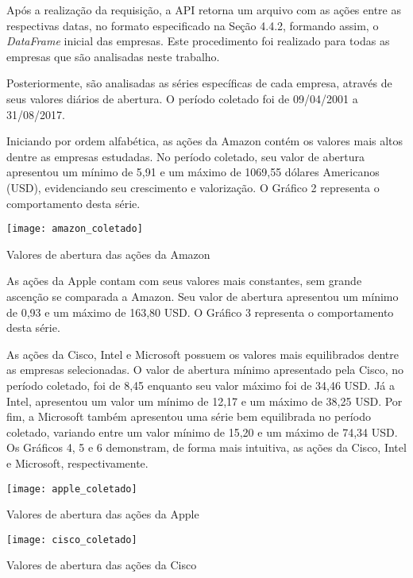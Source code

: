 Após a realização da requisição, a API retorna um arquivo com as ações entre as respectivas datas, no formato especificado na Seção 4.4.2, formando assim, o \textit{DataFrame} inicial das empresas. Este procedimento foi realizado para todas as empresas que são analisadas neste trabalho.

Posteriormente, são analisadas as séries específicas de cada empresa, através de seus valores diários de abertura. O período coletado foi de 09/04/2001 a 31/08/2017.

Iniciando por ordem alfabética, as ações da Amazon contém os valores mais altos dentre as empresas estudadas. No período coletado, seu valor de abertura apresentou um mínimo de 5,91 e um máximo de 1069,55 dólares Americanos (USD), evidenciando seu crescimento e valorização. O Gráfico 2 representa o comportamento desta série.
\begin{grafico}[h]
	\centering
	\centerline{\texttt{[image: amazon\_coletado]}}
	\caption{Valores de abertura das ações da Amazon}
	\label{exec-amazon-coleta}
\end{grafico}

As ações da Apple contam com seus valores mais constantes, sem grande ascenção se comparada a Amazon. Seu valor de abertura apresentou um mínimo de 0,93 e um máximo de 163,80 USD. O Gráfico 3 representa o comportamento desta série.

As ações da Cisco, Intel e Microsoft possuem os valores mais equilibrados dentre as empresas selecionadas. O valor de abertura mínimo apresentado pela Cisco, no período coletado, foi de 8,45 enquanto seu valor máximo foi de 34,46 USD. Já a Intel, apresentou um valor um mínimo de 12,17 e um máximo de 38,25 USD. Por fim, a Microsoft também apresentou uma série bem equilibrada no período coletado, variando entre um valor mínimo de 15,20 e um máximo de 74,34 USD. Os Gráficos 4, 5 e 6 demonstram, de forma mais intuitiva, as ações da Cisco, Intel e Microsoft, respectivamente. 	
\begin{grafico}[h]
	\centering
	\centerline{\texttt{[image: apple\_coletado]}}
	\caption{Valores de abertura das ações da Apple}
	\label{exec-apple-coleta}
\end{grafico}

\begin{grafico}[h]
	\centering
	\centerline{\texttt{[image: cisco\_coletado]}}
	\caption{Valores de abertura das ações da Cisco}
	\label{exec-cisco-coleta}
\end{grafico}
 
